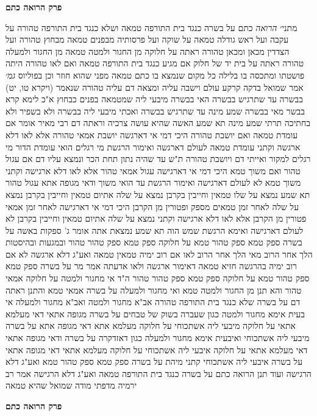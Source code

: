 \documentclass[12pt, openany]{book}
\newcommand{\sethebfont}{
\fontsize{10.5pt}{21.0pt} \selectfont
}
\newcommand{\twocol}[1]{
	{\sethebfont \begin{multicols}{2}
			#1
	\end{multicols}}	
}
\newcommand{\chapname}{}
\newcommand{\newchap}[1]{
	\addcontentsline{toc}{chapter}{#1}
	\renewcommand{\chapname}{#1}
		\begin{center}
			\textbf{%
\fontsize{16pt}{16pt}\selectfont
				#1}
		\end{center}
}
\begin{document}
\newchap{פרק  הרואה כתם}
\twocol{מתני׳ {\large\emph{הרואה}} כתם על בשרה כנגד בית התורפה טמאה ושלא כנגד בית התורפה טהורה על עקבה ועל ראש גודלה טמאה
על שוקה ועל פרסותיה מבפנים טמאה מבחוץ טהורה ועל הצדדין מכאן ומכאן טהורה 
ראתה על חלוקה מן החגור ולמטה טמאה מן החגור ולמעלה טהורה  ראתה על בית יד של חלוק אם מגיע כנגד בית התורפה טמאה ואם לאו טהורה 
היתה פושטתו ומתכסה בו בלילה כל מקום שנמצא בו כתם טמאה מפני שהוא חוזר  וכן בפוליוס
{\large\emph{גמ׳}} אמר שמואל בדקה קרקע עולם וישבה עליה ומצאה דם עליה טהורה שנאמר (ויקרא טו, יט) בבשרה עד שתרגיש בבשרה 
האי בבשרה מיבעי ליה שמטמאה בפנים כבחוץ  א"כ לימא קרא בבשר מאי בבשרה שמע מינה  עד שתרגיש בבשרה 
ואכתי מיבעי ליה  בבשרה ולא בשפיר ולא בחתיכה  תרתי שמע מינה 
תא שמע האשה שהיא עושה צרכיה וראתה דם רבי מאיר אומר  אם עומדת טמאה ואם יושבת טהורה 
היכי דמי  אי דארגשה יושבת אמאי טהורה  אלא לאו דלא ארגשה וקתני  עומדת טמאה 
לעולם דארגשה ואימור  הרגשת מי רגלים הואי  עומדת הדור מי רגלים למקור ואייתי דם ויושבת טהורה 
ת"ש  עד שהיה נתון תחת הכר ונמצא עליו דם אם עגול טהור ואם משוך טמא 
היכי דמי  אי דארגישה עגול אמאי טהור  אלא לאו דלא ארגישה וקתני  משוך טמא 
לא לעולם דארגישה ואימור  הרגשת עד הואי משוך ודאי מגופה אתא עגול טהור 
תא שמע  נמצא על שלו טמאין וחייבין בקרבן נמצא על שלה אתיום טמאין וחייבין בקרבן  נמצא על שלה לאחר זמן טמאים מספק ופטורין מן הקרבן 
היכי  דמי אי דארגישה לאחר זמן אמאי פטורין מן הקרבן  אלא לאו דלא ארגישה וקתני  נמצא על שלה אתיום טמאין וחייבין בקרבן  לא לעולם דארגישה ואימא  הרגשת שמש הוה 
תא שמע  נמצאת אתה אומר ג' ספקות באשה  על בשרה ספק טמא ספק טהור טמא  על חלוקה ספק טמא ספק טהור טהור  ובמגעות ובהיסטות הלך אחר הרוב 
מאי הלך אחר הרוב  לאו אם רוב ימיה טמאין טמאה ואע"ג דלא ארגשה 
לא אם רוב ימיה בהרגשה חזיא טמאה דאימור  ארגשה ולאו אדעתה 
אמר מר  על בשרה ספק טמא ספק טהור טמא  על חלוקה ספק טמא ספק טהור טהור 
ה"ד  אי מחגור ולמטה על חלוקה אמאי טהור  והא תנן  מן החגור ולמטה טמא  ואי מחגור ולמעלה על בשרה אמאי טמא  והתנן  ראתה דם על בשרה שלא כנגד בית התורפה טהורה 
אב"א  מחגור ולמטה ואב"א  מחגור ולמעלה  אי בעית אימא  מחגור ולמטה כגון שעברה בשוק של טבחים על בשרה מגופה אתאי דאי מעלמא אתאי על חלוקה מיבעי ליה אשתכוחי על חלוקה מעלמא אתא דאי מגופה אתא על בשרה מיבעי ליה אשתכוחי 
ואיבעית אימא  מחגור ולמעלה כגון דאזדקרה  על בשרה ודאי מגופה אתאי דאי מעלמא אתאי על חלוקה איבעי ליה אשתכוחי על חלוקה מעלמא אתאי דאי מגופה אתאי על בשרה איבעי ליה אשתכוחי 
קתני מיהת על בשרה ספק טמא ספק טהור טמא ואע"ג דלא הרגישה  ועוד תנן  הרואה כתם על בשרה כנגד בית התורפה טמאה ואע"ג דלא הרגישה  אמר רב ירמיה מדפתי  מודה שמואל שהיא טמאה}

\newchap{פרק  הרואה כתם}
\end{document}
